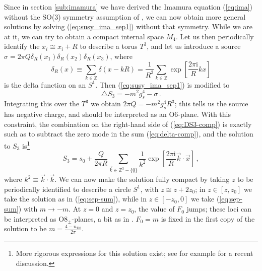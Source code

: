 \documentclass[12pt]{article}
\newcommand{\ii}{\mathrm{i}}
\begin{document}
Since in section \ref{sub:imamura} we have derived the Imamura equation (\ref{eq:ima}) without the SO(3) symmetry assumption of \cite{imamura}, we can now obtain more general solutions by solving (\ref{eq:susy_ima_sep1}) without that symmetry. While we are at it, we can try to obtain a compact internal space $M_4$. Let us then periodically identify the $x_i\cong x_i + R$ to describe a torus $T^3$, and let us introduce a source $\sigma = 2\pi Q \delta_R(x_1) \delta_R(x_2) \delta_R(x_3)$, where
\begin{equation}\label{eq:delta-comp}
	\delta_R(x)\equiv \sum_{k\in\mathbb{Z}} \delta(x- kR) = \frac1{R^3}\sum_{k \in \mathbb{Z}}\exp\left[\frac{2\pi\ii}R  k x \right]
\end{equation} 
is the delta function on an $S^1$. Then (\ref{eq:susy_ima_sep1}) is modified to
\begin{equation}\label{eq:DS3-comp}
	\triangle S_3 = - m^2 g_s^4 - \sigma\,.
\end{equation}
Integrating this over the $T^3$ we obtain $2\pi Q = -m^2 g_s^4 R^3$; this tells us the source has negative charge, and should be interpreted as an O6-plane. With this constraint, the combination on the right-hand side of (\ref{eq:DS3-comp}) is exactly such as to subtract the zero mode in the sum (\ref{eq:delta-comp}), and the solution to $S_3$ is\footnote{More rigorous expressions for this solution exist; see for example \cite[Sec.~3.2]{andriot-tsimpis-gw} for a recent discussion.}
\begin{equation}
	S_3 = s_0 + \frac{Q}{2\pi R}\sum_{\vec k \in \mathbb{Z}^3-\{\underline{0}\}} \frac1{k^2}\exp\left[\frac{2\pi\ii}R  \vec k \cdot \vec x \right]\,,
\end{equation}
where $k^2\equiv \vec k \cdot \vec k$. We can now make the solution fully compact by taking $z$ to be periodically identified to describe a circle $S^1$, with $z\cong z + 2 z_0$; in $z\in [z,z_0]$ we take the solution as in (\ref{eq:sep-sum}), while in $z\in [-z_0,0]$ we take (\ref{eq:sep-sum}) with $m\to -m$. At $z=0$ and $z=z_0$, the value of $F_0$ jumps; these loci can be interpreted as O8$_\pm$-planes, a bit as in \cite{cordova-deluca-t-ds4}. $F_0=m$ is fixed in the first copy of the solution to be $m=\frac {4-n_\mathrm{D8}}{2\pi}$. 
\end{document}
